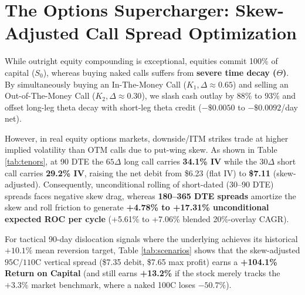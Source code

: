 \documentclass[10pt,twocolumn]{article}
\begin{document}
\section{The Options Supercharger: Skew-Adjusted Call Spread Optimization}
While outright equity compounding is exceptional, equities commit 100\% of capital ($S_0$), whereas buying naked calls suffers from \textbf{severe time decay ($\Theta$)}. By simultaneously buying an In-The-Money Call ($K_1, \Delta \approx 0.65$) and selling an Out-of-The-Money Call ($K_2, \Delta \approx 0.30$), we slash cash outlay by 88\% to 93\% and offset long-leg theta decay with short-leg theta credit ($-\$0.0050$ to $-\$0.0092$/day net).

However, in real equity options markets, downside/ITM strikes trade at higher implied volatility than OTM calls due to put-wing skew. As shown in Table \ref{tab:tenors}, at 90 DTE the $65\Delta$ long call carries \textbf{34.1\% IV} while the $30\Delta$ short call carries \textbf{29.2\% IV}, raising the net debit from \$6.23 (flat IV) to \textbf{\$7.11} (skew-adjusted). Consequently, unconditional rolling of short-dated (30--90 DTE) spreads faces negative skew drag, whereas \textbf{180--365 DTE spreads} amortize the skew and roll friction to generate \textbf{+4.78\% to +17.31\% unconditional expected ROC per cycle} (+5.61\% to +7.06\% blended 20\%-overlay CAGR).

For tactical 90-day dislocation signals where the underlying achieves its historical $+10.1\%$ mean reversion target, Table \ref{tab:scenarios} shows that the skew-adjusted $95\text{C}/110\text{C}$ vertical spread (\$7.35 debit, \$7.65 max profit) earns a \textbf{+104.1\% Return on Capital} (and still earns \textbf{+13.2\%} if the stock merely tracks the $+3.3\%$ market benchmark, where a naked 100C loses $-50.7\%$).
\end{document}
